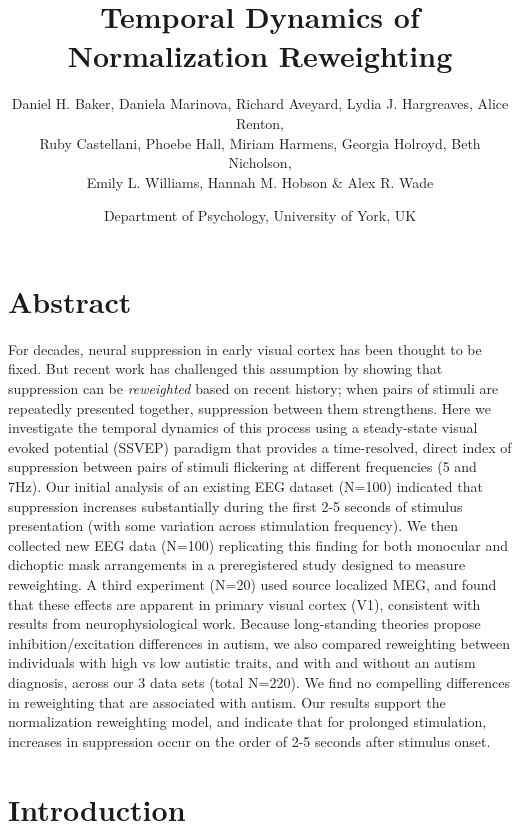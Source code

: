 \documentclass[
]{article}
\title{Temporal Dynamics of Normalization Reweighting}
\author{Daniel H. Baker, Daniela Marinova, Richard Aveyard, Lydia J. Hargreaves, Alice Renton,\\
Ruby Castellani, Phoebe Hall, Miriam Harmens, Georgia Holroyd, Beth Nicholson,\\
Emily L. Williams, Hannah M. Hobson \& Alex R. Wade}
\date{Department of Psychology, University of York, UK}
\begin{document}
\maketitle

\linenumbers

\hypertarget{abstract}{%
\section{Abstract}\label{abstract}}

For decades, neural suppression in early visual cortex has been thought to be fixed. But recent work has challenged this assumption by showing that suppression can be \emph{reweighted} based on recent history; when pairs of stimuli are repeatedly presented together, suppression between them strengthens. Here we investigate the temporal dynamics of this process using a steady-state visual evoked potential (SSVEP) paradigm that provides a time-resolved, direct index of suppression between pairs of stimuli flickering at different frequencies (5 and 7Hz). Our initial analysis of an existing EEG dataset (N=100) indicated that suppression increases substantially during the first 2-5 seconds of stimulus presentation (with some variation across stimulation frequency). We then collected new EEG data (N=100) replicating this finding for both monocular and dichoptic mask arrangements in a preregistered study designed to measure reweighting. A third experiment (N=20) used source localized MEG, and found that these effects are apparent in primary visual cortex (V1), consistent with results from neurophysiological work. Because long-standing theories propose inhibition/excitation differences in autism, we also compared reweighting between individuals with high vs low autistic traits, and with and without an autism diagnosis, across our 3 data sets (total N=220). We find no compelling differences in reweighting that are associated with autism. Our results support the normalization reweighting model, and indicate that for prolonged stimulation, increases in suppression occur on the order of 2-5 seconds after stimulus onset.

\hypertarget{introduction}{%
\section{Introduction}\label{introduction}}
\end{document}
